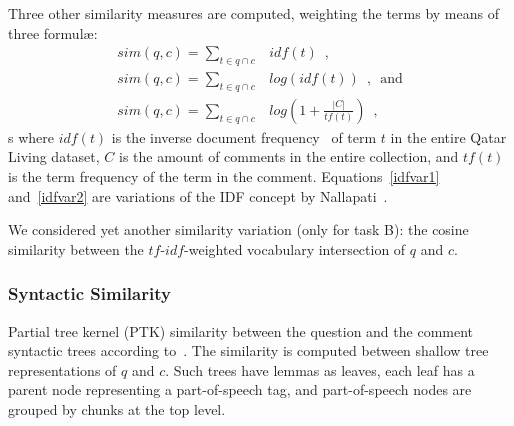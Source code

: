 Three other similarity measures are computed, weighting the terms by means of 
three 
formul\ae: 
%
\begin{eqnarray}
 sim(q, c)=\sum_{t\in q\cap c} & idf(t) \enspace,		\\
 sim(q, c)=\sum_{t\in q\cap c} & log(idf(t)) \enspace, \enspace \mathrm{and} 
\label{idfvar1}\\
 sim(q, c)=\sum_{t\in q\cap c} & log\left(1 + \frac{|C|}{tf(t)}\right) \enspace 
,
\label{idfvar2}
\end{eqnarray}
s
% 
where $idf(t)$ is the inverse document frequency~\cite{Jones:1972} of term $t$ 
in the entire Qatar Living dataset, $C$ is the amount of comments in the entire 
collection, and $tf(t)$ is the term frequency of the term in the comment. 
Equations~\ref{idfvar1} and~\ref{idfvar2} are variations of the IDF concept by 
Nallapati~.

We considered yet another similarity variation (only for task B): the cosine 
similarity between the $tf$-$idf$-weighted vocabulary intersection of $q$ and 
$c$.


\subsubsection{Syntactic Similarity}
\label{sub:syntactic}

Partial tree kernel (PTK) similarity between the question and the comment 
syntactic trees according to~\cite{Moschitti:2006}. The similarity is computed 
between shallow tree  representations of $q$ and $c$. Such trees have lemmas as 
leaves, each leaf has a parent node representing a part-of-speech tag, and 
part-of-speech nodes are grouped by chunks at the top level.

